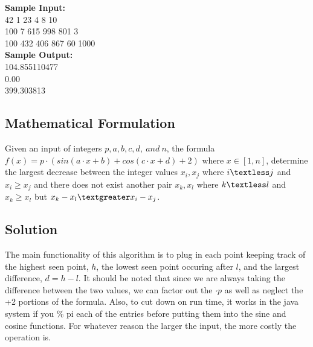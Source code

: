 \documentclass[12pt]{article}
\begin{document}
\noindent \textbf{Sample Input:} \\
42 1 23 4 8 10  \\
100 7 615 998 801 3  \\
100 432 406 867 60 1000  \\

\noindent \textbf{Sample Output:} \\
104.855110477  \\
0.00           \\
399.303813


\newpage

\subsection{Mathematical Formulation}
Given an input of integers $p, a, b, c, d,\ and\ n$, the formula
$f(x) = p\cdot (sin(a\cdot x + b) + cos(c\cdot x + d) + 2)$ where $x \in [1, n]$, determine the largest
decrease between the integer values $x_i, x_j$ where $i \textless j$ and $x_i \geq x_j$ and there does
not exist another pair $x_k, x_l$ where $k \textless l$ and $x_k \geq x_l$ but $x_k - x_l \textgreater x_i - x_j$.


\subsection{Solution}
The main functionality of this algorithm is to plug in each point keeping track of the highest seen point, $h$,
the lowest seen point occuring after $l$, and the largest difference, $d = h-l$. It should be noted that since
we are always taking the difference between the two values, we can factor out the $\cdot p$ as well as neglect
the +2 portions of the formula. Also, to cut down on run time, it works in the java system if you \% pi each of
the entries before putting them into the sine and cosine functions. For whatever reason the larger the input,
the more costly the operation is.
\end{document}
